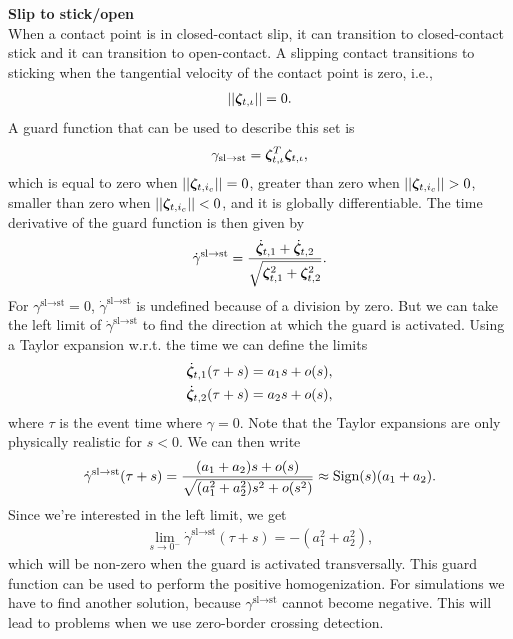 \documentclass[../DC2017114Bouma.tex]{subfiles}
\begin{document}
\textbf{Slip to stick/open}\\
When a contact point is in closed-contact slip, it can transition to closed-contact stick and it can transition to open-contact. A slipping contact transitions to sticking when the tangential velocity of the contact point is zero, i.e.,
\begin{align}
||\boldsymbol{\zeta}_{t,\iota}|| = 0.
\end{align}
A guard function that can be used to describe this set is
\begin{align}
\gamma_{\text{sl}\rightarrow\text{st}} = \boldsymbol{\zeta}_{t,\iota}^T\boldsymbol{\zeta}_{t,\iota},
\end{align}
which is equal to zero when $||\boldsymbol{\zeta}_{t,i_c}|| = 0$, greater than zero when $||\boldsymbol{\zeta}_{t,i_c}|| > 0$, smaller than zero when $||\boldsymbol{\zeta}_{t,i_c}|| < 0$, and it is globally differentiable. The time derivative of the guard function is then given by
\begin{align}
\dot{\gamma}^{\text{sl}\rightarrow\text{st}} = \frac{\dot{\boldsymbol{\zeta}}_{t,1} + \dot{\boldsymbol{\zeta}}_{t,2}}{\sqrt{\boldsymbol{\zeta}_{t,1}^2 + \boldsymbol{\zeta}_{t,2}^2}}.
\end{align}
For $\gamma^{\text{sl}\rightarrow\text{st}} = 0$, $\dot{\gamma}^{\text{sl}\rightarrow\text{st}}$ is undefined because of a division by zero. But we can take the left limit of $\dot{\gamma}^{\text{sl}\rightarrow\text{st}}$ to find the direction at which the guard is activated. Using a Taylor expansion w.r.t. the time we can define the limits
\begin{align}
\dot{\boldsymbol{\zeta}}_{t,1}(\tau + s) = a_1 s + o(s),\\
\dot{\boldsymbol{\zeta}}_{t,2}(\tau + s) = a_2 s + o(s),
\end{align}
where $\tau$ is the event time where $\gamma = 0$. Note that the Taylor expansions are only physically realistic for $s < 0$. We can then write
\begin{align}
\dot{\gamma}^{\text{sl}\rightarrow\text{st}}(\tau+s) = \frac{(a_1 + a_2)s + o(s)}{\sqrt{(a_1^2 + a_2^2)s^2 + o(s^2)}} \approx \operatorname{\text{Sign}}(s)(a_1 + a_2).
\end{align}
Since we're interested in the left limit, we get
\begin{align}
\lim\limits_{s\rightarrow 0^-}\dot{\gamma}^{\text{sl}\rightarrow\text{st}}(\tau+s) = -(a^2_1 + a^2_2),
\end{align}
which will be non-zero when the guard is activated transversally. This guard function can be used to perform the positive homogenization. For simulations we have to find another solution, because $\gamma^{\text{sl}\rightarrow\text{st}}$ cannot become negative. This will lead to problems when we use zero-border crossing detection.
\end{document}
